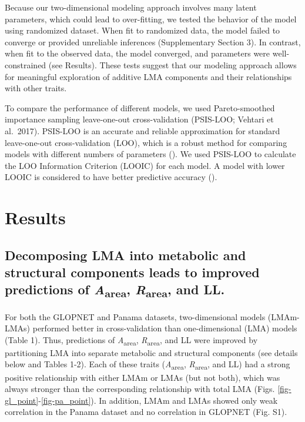 \documentclass[
  12pt,
  letterpaper,
  DIV=11,
  numbers=noendperiod]{scrartcl}
\begin{document}
Because our two-dimensional modeling approach involves many latent
parameters, which could lead to over-fitting, we tested the behavior of
the model using randomized dataset. When fit to randomized data, the
model failed to converge or provided unreliable inferences
(Supplementary Section 3). In contrast, when fit to the observed data,
the model converged, and parameters were well-constrained (see Results).
These tests suggest that our modeling approach allows for meaningful
exploration of additive LMA components and their relationships with
other traits.

To compare the performance of different models, we used Pareto-smoothed
importance sampling leave-one-out cross-validation (PSIS-LOO; Vehtari et
al.~2017). PSIS-LOO is an accurate and reliable approximation for
standard leave-one-out cross-validation (LOO), which is a robust method
for comparing models with different numbers of parameters
(). We used PSIS-LOO to
calculate the LOO Information Criterion (LOOIC) for each model. A model
with lower LOOIC is considered to have better predictive accuracy
().

\section{Results}\label{results}

\subsection{\texorpdfstring{Decomposing LMA into metabolic and
structural components leads to improved predictions of
\emph{A}\textsubscript{area}, \emph{R}\textsubscript{area}, and
LL.}{Decomposing LMA into metabolic and structural components leads to improved predictions of Aarea, Rarea, and LL.}}\label{decomposing-lma-into-metabolic-and-structural-components-leads-to-improved-predictions-of-aarea-rarea-and-ll.}

For both the GLOPNET and Panama datasets, two-dimensional models
(LMAm-LMAs) performed better in cross-validation than one-dimensional
(LMA) models (Table 1). Thus, predictions of
\emph{A}\textsubscript{area}, \emph{R}\textsubscript{area}, and LL were
improved by partitioning LMA into separate metabolic and structural
components (see details below and Tables 1-2). Each of these traits
(\emph{A}\textsubscript{area}, \emph{R}\textsubscript{area}, and LL) had
a strong positive relationship with either LMAm or LMAs (but not both),
which was always stronger than the corresponding relationship with total
LMA (Figs. \ref{fig-gl_point}-\ref{fig-pa_point}). In addition, LMAm and
LMAs showed only weak correlation in the Panama dataset and no
correlation in GLOPNET (Fig. S1).
\end{document}
